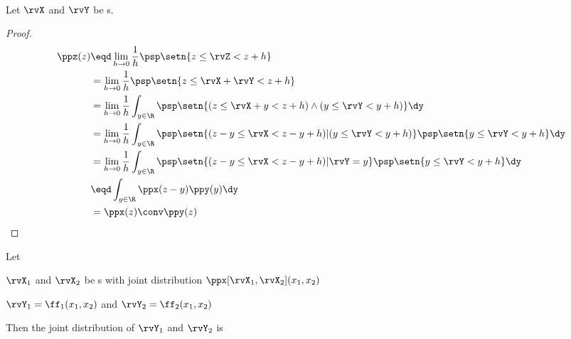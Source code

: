 \begin{theorem}
\mbox{}\\
Let $\rvX$ and $\rvY$ be s.
\end{theorem}
\begin{proof}
\begin{align*}
  \ppz(z)
    &\eqd \lim_{h\to0}\frac{1}{h} \psp\setn{z \le \rvZ < z+h }
  \\&=    \lim_{h\to0}\frac{1}{h} \psp\setn{z \le\rvX+\rvY < z+h }
  \\&=    \lim_{h\to0}\frac{1}{h} \int_{y\in\R} \psp\setn{(z \le\rvX+y < z+h) \land (y\le\rvY<y+h) } \dy
  \\&=    \lim_{h\to0}\frac{1}{h} \int_{y\in\R} \psp\setn{(z-y \le\rvX < z-y+h) | (y\le\rvY<y+h) }\psp\setn{y\le\rvY<y+h} \dy
  \\&=    \lim_{h\to0}\frac{1}{h} \int_{y\in\R} \psp\setn{(z-y \le\rvX < z-y+h) |\rvY=y }\psp\setn{y\le\rvY<y+h} \dy
  \\&\eqd \int_{y\in\R} \ppx(z-y) \ppy(y)  \dy
  \\&=    \ppx(z) \conv \ppy(z)
\end{align*}
\end{proof}

\begin{theorem}
\label{thm:x1x2->y1y2}
Let
\begin{liste}
  \item $\rvX_1$ and $\rvX_2$ be s with joint distribution
        $\ppx[\rvX_1,\rvX_2](x_1,x_2)$
  \item $\rvY_1=\ff_1(x_1,x_2)$ and $\rvY_2=\ff_2(x_1,x_2)$
\end{liste}
Then the joint distribution of $\rvY_1$ and $\rvY_2$ is
\end{theorem}


